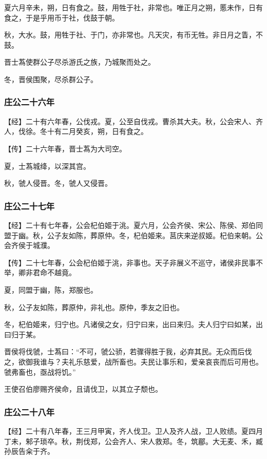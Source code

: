 \documentclass[]{article}
\begin{document}
夏六月辛未，朔，日有食之。鼓，用牲于社，非常也。唯正月之朔，慝未作，日有食之，于是乎用币于社，伐鼓于朝。

秋，大水。鼓，用牲于社、于门，亦非常也。凡天灾，有币无牲。非日月之眚，不鼓。

晋士蒍使群公子尽杀游氏之族，乃城聚而处之。

冬，晋侯围聚，尽杀群公子。

\hypertarget{header-n550}{%
\subsubsection{庄公二十六年}\label{header-n550}}

【经】二十有六年春，公伐戎。夏，公至自伐戎。曹杀其大夫。秋，公会宋人、齐人，伐徐。冬十有二月癸亥，朔，日有食之。

【传】二十六年春，晋士蒍为大司空。

夏，士蒍城绛，以深其宫。

秋，虢人侵晋。冬，虢人又侵晋。

\hypertarget{header-n557}{%
\subsubsection{庄公二十七年}\label{header-n557}}

【经】二十有七年春，公会杞伯姬于洮。夏六月，公会齐侯、宋公、陈侯、郑伯同盟于幽。秋，公子友如陈，葬原仲。冬，杞伯姬来。莒庆来逆叔姬。杞伯来朝。公会齐侯于城濮。

【传】二十七年春，公会杞伯姬于洮，非事也。天子非展义不巡守，诸侯非民事不举，卿非君命不越竟。

夏，同盟于幽，陈，郑服也。

秋，公子友如陈，葬原仲，非礼也。原仲，季友之旧也。

冬，杞伯姬来，归宁也。凡诸侯之女，归宁曰来，出曰来归。夫人归宁曰如某，出曰归于某。

晋侯将伐虢，士蒍曰：``不可，虢公骄，若骤得胜于我，必弃其民。无众而后伐之，欲御我谁与？夫礼乐慈爱，战所畜也。夫民让事乐和，爱亲哀丧而后可用也。虢弗畜也，亟战将饥。''

王使召伯廖赐齐侯命，且请伐卫，以其立子颓也。

\hypertarget{header-n567}{%
\subsubsection{庄公二十八年}\label{header-n567}}

【经】二十有八年春，王三月甲寅，齐人伐卫。卫人及齐人战，卫人败绩。夏四月丁未，邾子琐卒。秋，荆伐郑，公会齐人、宋人救郑。冬，筑郿。大无麦、禾，臧孙辰告籴于齐。
\end{document}
